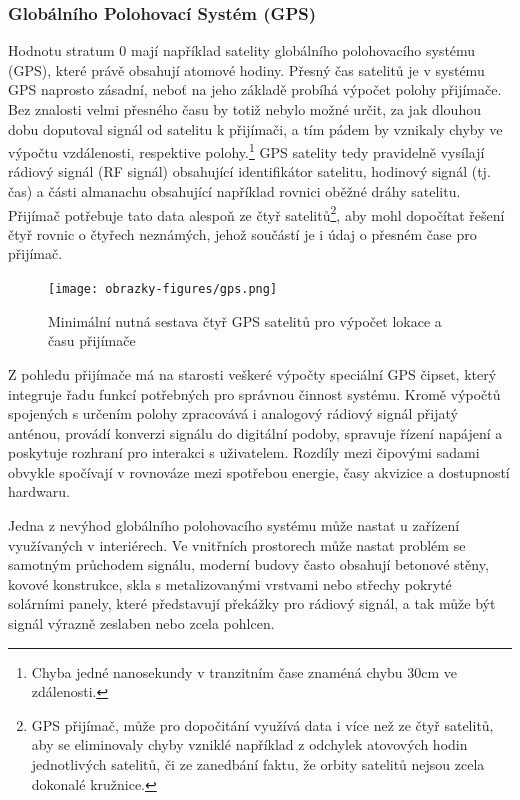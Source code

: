 \subsubsection{Globálního Polohovací Systém (GPS)}
Hodnotu stratum 0 mají například satelity globálního polohovacího systému (GPS), které právě obsahují atomové hodiny. Přesný čas satelitů je v systému GPS naprosto zásadní, neboť na jeho základě probíhá výpočet polohy přijímače. Bez znalosti velmi přesného času by totiž nebylo možné určit, za jak dlouhou dobu doputoval signál od satelitu k přijímači, a tím pádem by vznikaly chyby ve výpočtu vzdálenosti, respektive polohy.\footnote{Chyba jedné nanosekundy v tranzitním čase znaméná chybu 30cm ve zdálenosti.} GPS satelity tedy pravidelně vysílají rádiový signál (RF signál) obsahující identifikátor satelitu, hodinový signál (tj. čas) a části almanachu obsahující například rovnici oběžné dráhy satelitu. Přijímač potřebuje tato data alespoň ze čtyř satelitů\footnote{GPS přijímač, může pro dopočitání využívá data i více než ze čtyř satelitů, aby se eliminovaly chyby vzniklé například z odchylek atovových hodin jednotlivých satelitů, či ze zanedbání faktu, že orbity satelitů nejsou zcela dokonalé kružnice.}, aby mohl dopočítat řešení čtyř rovnic o čtyřech neznámých, jehož součástí je i údaj o přesném čase pro přijímač. \cite{sparkfun_gps, time_theory_gps}

\begin{figure}[h]
    \centering
    \texttt{[image: obrazky-figures/gps.png]}
    
    \caption{Minimální nutná sestava čtyř GPS satelitů pro výpočet lokace a času přijímače \cite{time_theory_gps}}
    \label{fig:low-power-modes}
\end{figure}

Z pohledu přijímače má na starosti veškeré výpočty speciální GPS čipset, který integruje řadu funkcí potřebných pro správnou činnost systému. Kromě výpočtů spojených s určením polohy zpracovává i analogový rádiový signál přijatý anténou, provádí konverzi signálu do digitální podoby, spravuje řízení napájení a poskytuje rozhraní pro interakci s uživatelem. Rozdíly mezi čipovými sadami obvykle spočívají v rovnováze mezi spotřebou energie, časy akvizice a dostupností hardwaru. \cite{sparkfun_gps}

Jedna z nevýhod globálního polohovacího systému může nastat u zařízení využívaných v interiérech. Ve vnitřních prostorech může nastat problém se samotným průchodem signálu, moderní budovy často obsahují betonové stěny, kovové konstrukce, skla s metalizovanými vrstvami nebo střechy pokryté solárními panely, které představují překážky pro rádiový signál, a tak může být signál výrazně zeslaben nebo zcela pohlcen.

